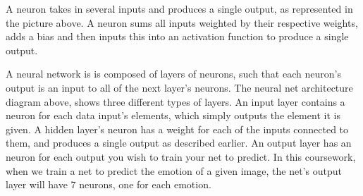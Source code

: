A neuron takes in several inputs and produces a single output, as represented in the picture above.
A neuron sums all inputs weighted by their respective weights,
adds a bias and then inputs this into an activation function to produce a single output.

A neural network is is composed of layers of neurons,
such that each neuron's output is an input to all of the next layer's neurons.
The neural net architecture diagram above, shows three different types of layers.
An input layer contains a neuron for each data input's elements, which simply outputs the element it is given.
A hidden layer's neuron has a weight for each of the inputs connected to them,
and produces a single output as described earlier.
An output layer has an neuron for each output you wish to train your net to predict.
In this coursework, when we train a net to predict the emotion of a given image,
the net's output layer will have 7 neurons, one for each emotion.


